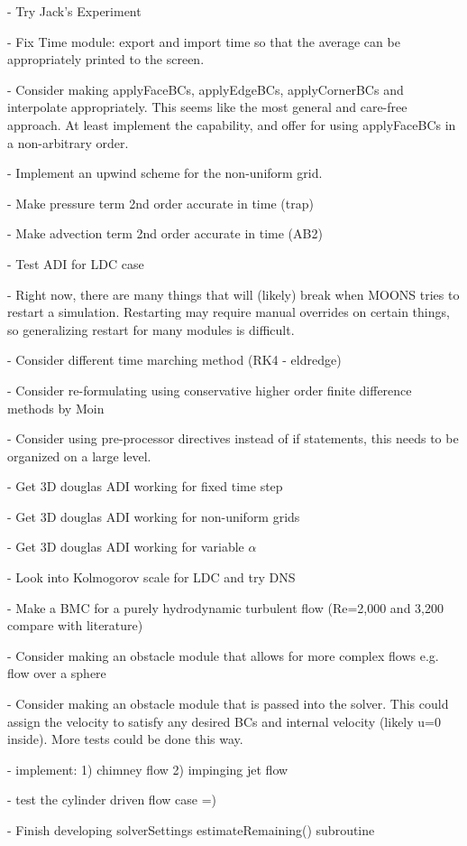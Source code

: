 \documentclass[11pt]{article}
\begin{document}
- Try Jack's Experiment

- Fix Time module: export and import time so that the average can be appropriately
printed to the screen.

- Consider making applyFaceBCs, applyEdgeBCs, applyCornerBCs and interpolate appropriately. This seems like the most general and care-free approach. At least implement the capability, and offer for using applyFaceBCs in a non-arbitrary order.

- Implement an upwind scheme for the non-uniform grid.

- Make pressure term 2nd order accurate in time (trap)

- Make advection term 2nd order accurate in time (AB2)

- Test ADI for LDC case

- Right now, there are many things that will (likely) break when MOONS tries to restart a simulation. Restarting may require manual overrides on certain things, so generalizing restart for many modules is difficult.

- Consider different time marching method (RK4 - eldredge)

- Consider re-formulating using conservative higher order finite difference methods by Moin

- Consider using pre-processor directives instead of if statements, this needs to be organized on a large level.

- Get 3D douglas ADI working for fixed time step

- Get 3D douglas ADI working for non-uniform grids

- Get 3D douglas ADI working for variable $\alpha$

- Look into Kolmogorov scale for LDC and try DNS

- Make a BMC for a purely hydrodynamic turbulent flow (Re=2,000 and 3,200 compare with literature)

- Consider making an obstacle module that allows for more complex flows
e.g. flow over a sphere

- Consider making an obstacle module that is passed into the solver.
This could assign the velocity to satisfy any desired BCs and internal
velocity (likely u=0 inside). More tests could be done this way.

- implement: 1) chimney flow 2) impinging jet flow

- test the cylinder driven flow case =)

- Finish developing solverSettings estimateRemaining() subroutine
\end{document}
